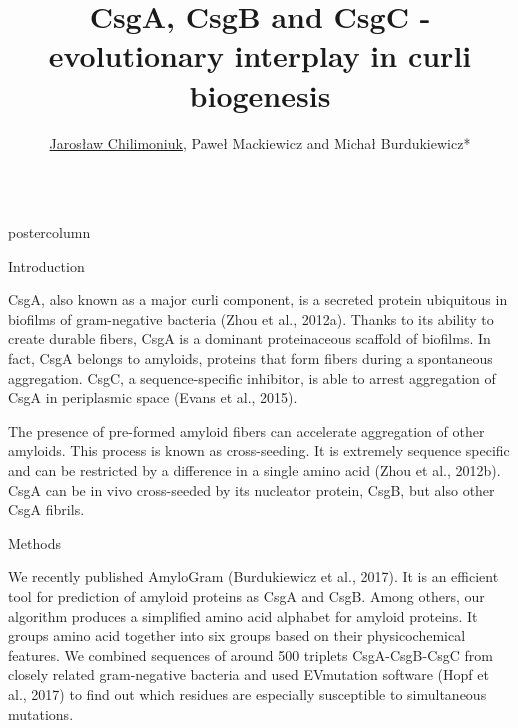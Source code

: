 \documentclass[final]{beamer}
\newlength{\columnheight}
\begin{document}





\date{}
\author{\large \underline{Jaros\l{}aw Chilimoniuk}, Pawe\l{} Mackiewicz and Micha\l{} Burdukiewicz*\\
\bigskip
{}}

\title{\huge CsgA, CsgB and CsgC - evolutionary interplay in curli biogenesis}


\begin{frame}
\begin{columns}
\begin{column}{.48\textwidth}
\begin{beamercolorbox}[center,wd=\textwidth]{postercolumn}
\begin{minipage}[T]{.95\textwidth}
\parbox[t][\columnheight]{\textwidth}
{
\begin{block}{Introduction}

CsgA, also known as a major curli component, is a secreted protein ubiquitous in biofilms of gram-negative bacteria (Zhou et al., 2012a). Thanks to its ability to create durable fibers, CsgA is a dominant proteinaceous scaffold of biofilms. In fact, CsgA belongs to amyloids, proteins that form fibers during a spontaneous aggregation. CsgC, a sequence-specific inhibitor, is able to arrest aggregation of CsgA in periplasmic space (Evans et al., 2015).

The presence of pre-formed amyloid fibers can accelerate aggregation of other amyloids. This process is known as cross-seeding. It is extremely sequence specific and can be restricted by a difference in a single amino acid (Zhou et al., 2012b). CsgA can be in vivo cross-seeded by its nucleator protein, CsgB, but also other CsgA fibrils.

\end{block}

\begin{block}{Methods}

We recently published AmyloGram (Burdukiewicz et al., 2017). It is an efficient tool for prediction of amyloid proteins as CsgA and CsgB. Among others, our algorithm produces a simplified amino acid alphabet for amyloid proteins. It groups amino acid together into six groups based on their physicochemical features. We combined sequences of around 500 triplets CsgA-CsgB-CsgC from closely related gram-negative bacteria and used EVmutation software (Hopf et al., 2017) to find out which residues are especially susceptible to simultaneous mutations. 


\end{block}}
\end{minipage}
\end{beamercolorbox}
\end{column}
\end{columns}
\end{frame}
\end{document}
